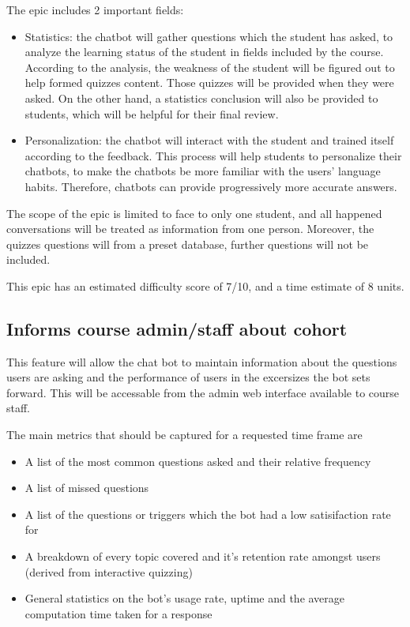 \documentclass{article}
\begin{document}
The epic includes 2 important fields:
\begin{itemize}
  \item Statistics: the chatbot will gather questions which the student has asked, to analyze the learning status of the student in fields included by the course. According to the analysis, the weakness of the student will be figured out to help formed quizzes content. Those quizzes will be provided when they were asked. On the other hand, a statistics conclusion will also be provided to students, which will be helpful for their final review.
  \item Personalization: the chatbot will interact with the student and trained itself according to the feedback. This process will help students to personalize their chatbots, to make the chatbots be more familiar with the users’ language habits. Therefore, chatbots can provide progressively more accurate answers. 
\end{itemize}

The scope of the epic is limited to face to only one student, and all happened conversations will be treated as information from one person. Moreover, the quizzes questions will from a preset database, further questions will not be included.

This epic has an estimated difficulty score of 7/10, and a time estimate of 8 units.


\subsection{Informs course admin/staff about cohort}

This feature will allow the chat bot to maintain information about the questions users are asking and the performance of users in the excersizes the bot sets forward. This will be accessable from the admin web interface available to course staff.

The main metrics that should be captured for a requested time frame are
\begin{itemize}
  \item A list of the most common questions asked and their relative frequency
  \item A list of missed questions
  \item A list of the questions or triggers which the bot had a low satisifaction rate for
  \item A breakdown of every topic covered and it's retention rate amongst users (derived from interactive quizzing)
  \item General statistics on the bot's usage rate, uptime and the average computation time taken for a response
\end{itemize}
\end{document}
